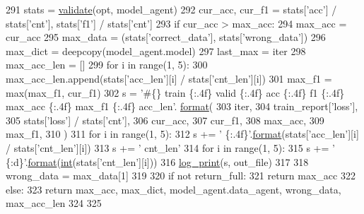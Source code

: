 \begin{DoxyCode}
291             stats = \hyperlink{namespacegraph__world2_1_1train_aa00e41e1619128901ea053170fedef0b}{validate}(opt, model\_agent)
292             cur\_acc, cur\_f1 = stats[\textcolor{stringliteral}{'acc'}] / stats[\textcolor{stringliteral}{'cnt'}], stats[\textcolor{stringliteral}{'f1'}] / stats[\textcolor{stringliteral}{'cnt'}]
293             \textcolor{keywordflow}{if} cur\_acc > max\_acc:
294                 max\_acc = cur\_acc
295                 max\_data = (stats[\textcolor{stringliteral}{'correct\_data'}], stats[\textcolor{stringliteral}{'wrong\_data'}])
296                 max\_dict = deepcopy(model\_agent.model)
297                 last\_max = iter
298                 max\_acc\_len = []
299                 \textcolor{keywordflow}{for} i \textcolor{keywordflow}{in} range(1, 5):
300                     max\_acc\_len.append(stats[\textcolor{stringliteral}{'acc\_len'}][i] / stats[\textcolor{stringliteral}{'cnt\_len'}][i])
301             max\_f1 = max(max\_f1, cur\_f1)
302             s = \textcolor{stringliteral}{'#\{\} train \{:.4f\} valid \{:.4f\} acc \{:.4f\} f1 \{:.4f\} max\_acc \{:.4f\} max\_f1 \{:.4f\} acc\_len'}.
      \hyperlink{namespaceparlai_1_1chat__service_1_1services_1_1messenger_1_1shared__utils_a32e2e2022b824fbaf80c747160b52a76}{format}(
303                 iter,
304                 train\_report[\textcolor{stringliteral}{'loss'}],
305                 stats[\textcolor{stringliteral}{'loss'}] / stats[\textcolor{stringliteral}{'cnt'}],
306                 cur\_acc,
307                 cur\_f1,
308                 max\_acc,
309                 max\_f1,
310             )
311             \textcolor{keywordflow}{for} i \textcolor{keywordflow}{in} range(1, 5):
312                 s += \textcolor{stringliteral}{' \{:.4f\}'}.\hyperlink{namespaceparlai_1_1chat__service_1_1services_1_1messenger_1_1shared__utils_a32e2e2022b824fbaf80c747160b52a76}{format}(stats[\textcolor{stringliteral}{'acc\_len'}][i] / stats[\textcolor{stringliteral}{'cnt\_len'}][i])
313             s += \textcolor{stringliteral}{' cnt\_len'}
314             \textcolor{keywordflow}{for} i \textcolor{keywordflow}{in} range(1, 5):
315                 s += \textcolor{stringliteral}{' \{:d\}'}.\hyperlink{namespaceparlai_1_1chat__service_1_1services_1_1messenger_1_1shared__utils_a32e2e2022b824fbaf80c747160b52a76}{format}(\hyperlink{namespacegraph__world2_1_1train_ae777b30e4de8f0cdfc26bfda0c01b316}{int}(stats[\textcolor{stringliteral}{'cnt\_len'}][i]))
316             \hyperlink{namespacegraph__world2_1_1train_a145007eac2c8c1c128ec06f4477c943e}{log\_print}(s, out\_file)
317 
318     wrong\_data = max\_data[1]
319 
320     \textcolor{keywordflow}{if} \textcolor{keywordflow}{not} return\_full:
321         \textcolor{keywordflow}{return} max\_acc
322     \textcolor{keywordflow}{else}:
323         \textcolor{keywordflow}{return} max\_acc, max\_dict, model\_agent.data\_agent, wrong\_data, max\_acc\_len
324 
325 
\end{DoxyCode}
\mbox{\label{namespacegraph__world2_1_1train_a8f5e91b9cb92f65b8b096d7eb5dbf2e7}} 
